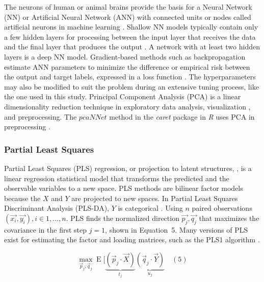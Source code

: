 \let\LaTeXcline\cline\documentclass[sn-mathphys-num]{sn-jnl}\let\cline\LaTeXcline
\begin{document}
The neurons of human or animal brains provide the basis for a Neural Network (NN) or Artificial Neural Network (ANN) with connected units or nodes called artificial neurons in machine learning \cite{brahme2014comprehensive}. Shallow NN models typically contain only a few hidden layers for processing between the input layer that receives the data and the final layer that produces the output \cite{olden2002illuminating}. A network with at least two hidden layers \cite{bishop2006pattern} is a deep NN model. Gradient-based methods such as backpropagation estimate ANN parameters \cite{vapnik2013nature} to minimize the difference or empirical risk between the output and target labels, expressed in a loss function \cite{goodfellow2016deep}. The hyperparameters may also be modified to suit the problem \cite{probst2019tunability} during an extensive tuning process, like the one used in this study. Principal Component Analysis (PCA) \cite{stewart2019introduction} is a linear dimensionality reduction technique in exploratory data analysis, visualization \cite{jolliffe2016principal}, and preprocessing. The $pcaNNet$ method in the \textit{caret} package in \textit{R} uses PCA in preprocessing \cite{Kuhn2007, kuhn2008building, kuhn2013applied}.

\subsubsection{Partial Least Squares}

Partial Least Squares (PLS) regression, or projection to latent structures, \cite{abdi2010partial}, is a linear regression statistical model that transforms the predicted and the observable variables to a new space. PLS methods are bilinear factor models because the $X$ and $Y$ are projected to new spaces. In Partial Least Squares Discriminant Analysis (PLS-DA), $Y$ is categorical \cite{saebo2008lpls}. Using $n$ paired observations $\left(\vec{x_{i}}, \vec{y_{i}}\right), i \in 1, \dots, n$. PLS finds the normalized direction $\vec{p_{j}}, \vec{q_{j}}$ that maximizes the covariance in the first step $j = 1$, shown in Equation~5. Many versions of PLS exist for estimating the factor and loading matrices, such as the PLS1 algorithm \cite{GONZALEZ2023104876}.

\begin{equation}
	\max_{{\vec{p}}_{j},{\vec{q}}_{j}}\operatorname{E} [\underbrace{({\vec{p}}_{j}\cdot {\vec{X}})}_{t_{j}}\underbrace{({\vec{q}}_{j}\cdot {\vec{Y}})}_{u_{j}}
	\quad\left(5\right)
\end{equation}
\end{document}
